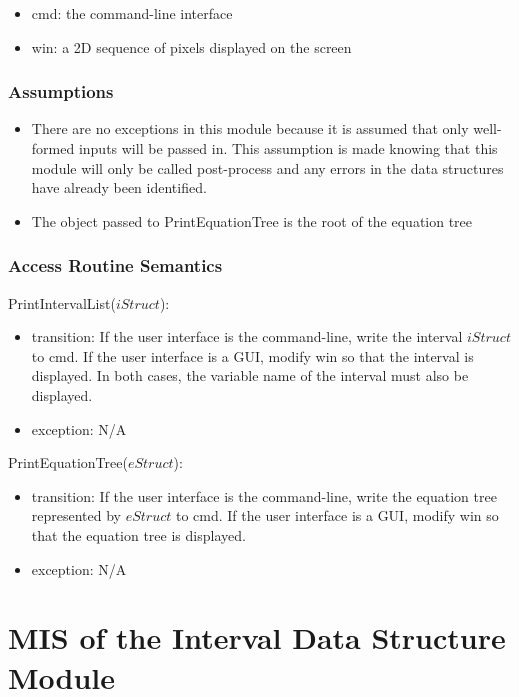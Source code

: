 \documentclass[12pt, titlepage]{article}
\begin{document}
\begin{itemize}
	\item cmd: the command-line interface
	\item win: a 2D sequence of pixels displayed on the screen
\end{itemize}

\subsubsection{Assumptions}

\begin{itemize}
	\item There are no exceptions in this module because it is assumed that 
	only well-formed inputs will be passed in. This assumption is made knowing 
	that this module will only be called post-process and any errors in the 
	data structures have already been identified.
	\item The object passed to PrintEquationTree is the root of the equation 
	tree
\end{itemize}


\subsubsection{Access Routine Semantics}

\noindent PrintIntervalList($iStruct$):
\begin{itemize}
	\item transition: If the user interface is the command-line, write the 
	interval $iStruct$ to cmd. If the user interface is a GUI, modify win so 
	that the interval is displayed. In both cases, the variable name of the 
	interval must also be displayed.
	\item exception: N/A
\end{itemize}

\noindent PrintEquationTree($eStruct$):
\begin{itemize}
	\item transition: If the user interface is the command-line, write the 
	equation tree represented by $eStruct$ to cmd. If the user interface is a 
	GUI, modify win so that the equation tree is displayed.
	\item exception: N/A
\end{itemize}

\newpage

\section{MIS of the Interval Data Structure Module} 
\label{Module_intervaldatastructure}
\end{document}
